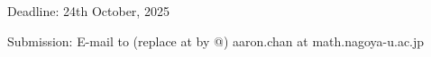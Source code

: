 \documentclass[12pt]{article}
\begin{document}

\vfill
\hfill Deadline: 24th October, 2025

\hfill Submission: E-mail to (replace at by @) aaron.chan at math.nagoya-u.ac.jp
\end{document}
